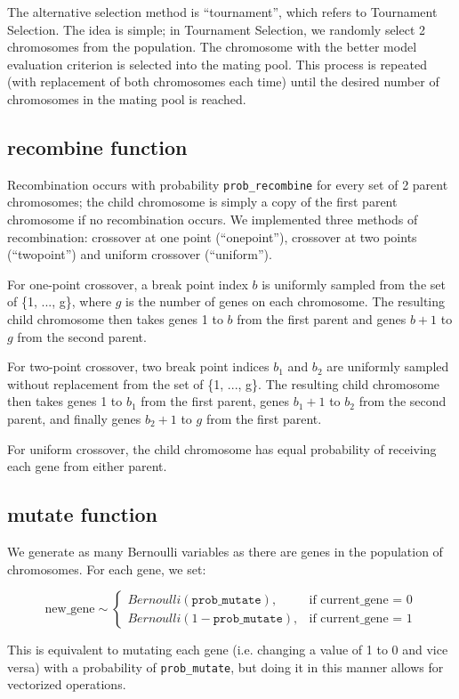 \documentclass[11pt]{article}
\begin{document}
The alternative selection method is ``tournament'', which refers to Tournament Selection. The idea is simple; in Tournament Selection, we randomly select 2 chromosomes from the population. The chromosome with the better model evaluation criterion is selected into the mating pool. This process is repeated (with replacement of both chromosomes each time) until the desired number of chromosomes in the mating pool is reached.

\subsection*{recombine function}
Recombination occurs with probability \texttt{prob\_recombine} for every set of 2 parent chromosomes; the child chromosome is simply a copy of the first parent chromosome if no recombination occurs. We implemented three methods of recombination: crossover at one point (``onepoint''), crossover at two points (``twopoint'') and uniform crossover (``uniform'').

For one-point crossover, a break point index $b$ is uniformly sampled from the set of \{1, ..., g\}, where $g$ is the number of genes on each chromosome. The resulting child chromosome then takes genes 1 to $b$ from the first parent and genes $b+1$ to $g$ from the second parent.

For two-point crossover, two break point indices $b_1$ and $b_2$ are uniformly sampled without replacement from the set of \{1, ..., g\}. The resulting child chromosome then takes genes 1 to $b_1$ from the first parent, genes $b_1+1$ to $b_2$ from the second parent, and finally genes $b_2+1$ to $g$ from the first parent.

For uniform crossover, the child chromosome has equal probability of receiving each gene from either parent.

\subsection*{mutate function}
We generate as many Bernoulli variables as there are genes in the population of chromosomes. For each gene, we set:

\[
\text{new\_gene} \sim
\begin{cases}
Bernoulli(\texttt{prob\_mutate}), & \text{if current\_gene = 0}\\
Bernoulli(1-\texttt{prob\_mutate}), & \text{if current\_gene = 1}
\end{cases}
\]

This is equivalent to mutating each gene (i.e. changing a value of 1 to 0 and vice versa) with a probability of \texttt{prob\_mutate}, but doing it in this manner allows for vectorized operations.
\end{document}
